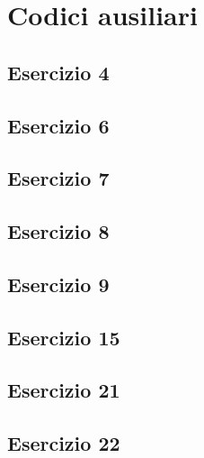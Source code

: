 \section{Codici ausiliari}

\subsection{Esercizio 4}


\subsection{Esercizio 6}


\subsection{Esercizio 7}


\subsection{Esercizio 8}


\subsection{Esercizio 9}


\subsection{Esercizio 15}


\subsection{Esercizio 21}


\subsection{Esercizio 22}


